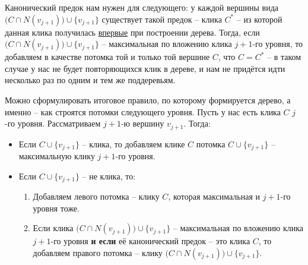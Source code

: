 \documentclass[a4paper,12pt]{article}
\begin{document}
Канонический предок нам нужен для следующего: у каждой вершины вида  $\big(C \cap N(v_{j + 1})\big)\cup\{v_{j + 1}\}$ существует такой предок -- клика $C^*$ -- из которой данная клика получилась \underline{впервые} при построении дерева. Тогда, если $\big(C \cap N(v_{j + 1})\big)\cup\{v_{j + 1}\}$ -- максимальная по вложению клика $j + 1$-го уровня, то  добавляем  в качестве потомка той и только той вершине $C$, что $C = C^*$ -- в таком случае у нас не будет повторяющихся клик в дереве, и нам не придётся идти несколько раз по одним и тем же поддеревьям.

Можно сформулировать итоговое правило, по которому формируется дерево, а именно -- как строятся потомки следующего уровня. Пусть у нас есть клика $C$ $j$-го уровня. Рассматриваем $j+1$-ю вершину $v_{j + 1}$. Тогда:
\begin{itemize}
    \item Если $C \cup \{v_{j + 1}\}$ -- клика, то добавляем клике $C$ потомка $C \cup \{v_{j + 1}\}$ -- максимальную клику $j + 1$-го уровня.
    \item Если $C \cup \{v_{j + 1}\}$ -- не клика, то:
    \begin{enumerate}
        \item Добавляем левого потомка -- клику $C$, которая максимальная и $j + 1$-го уровня тоже.
        \item Если клика $\big(C \cap N(v_{j + 1})\big)\cup\{v_{j + 1}\}$ -- максимальная по вложению клика $j + 1$-го уровня \textbf{и если} её канонический предок -- это клика $C$, то добавляем правого потомка -- клику $\big(C \cap N(v_{j + 1})\big)\cup\{v_{j + 1}\}$.
    \end{enumerate}
\end{itemize}
\end{document}
